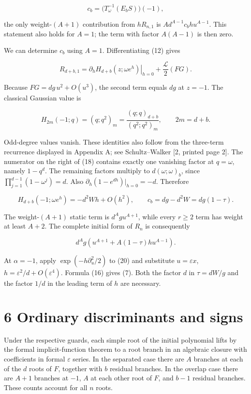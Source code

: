 \documentclass[
  11pt,
]{article}
\begin{document}
\[
c_b=\bigl(T_\omega^{-1}(E_bS)\bigr)(-1),
\]

the only weight-\((A+1)\) contribution from \(hR_{n,1}\) is
\(Ad^{A-1}c_bhu^{A-1}\). This statement also holds for \(A=1\); the term
with factor \(A(A-1)\) is then zero.

We can determine \(c_b\) using \(A=1\). Differentiating (12) gives

\[
R_{d+b,1}=\left.\partial_hH_{d+b}(z;\omega e^h)\right|_{h=0}
+\frac{\mathcal L}{2}(FG).
\]

Because \(FG=dg\,u^2+O(u^3)\), the second term equals \(dg\) at
\(z=-1\). The classical Gaussian value is

\[
H_{2m}(-1;q)=(q;q^2)_m
=\frac{(q;q)_{d+b}}{(q^2;q^2)_m},\qquad 2m=d+b. \tag{18}
\]

Odd-degree values vanish. These identities also follow from the
three-term recurrence displayed in Appendix A; see Schultz--Walker {[}2,
printed page 2{]}. The numerator on the right of (18) contains exactly
one vanishing factor at \(q=\omega\), namely \(1-q^d\). The remaining
factors multiply to \(d(\omega;\omega)_b\), since
\(\prod_{j=1}^{d-1}(1-\omega^j)=d\). Also
\(\partial_h(1-e^{dh})|_{h=0}=-d\). Therefore

\[
H_{d+b}(-1;\omega e^h)=-d^2Wh+O(h^2),
\qquad c_b=dg-d^2W=dg(1-\tau). \tag{19}
\]

The weight-\((A+1)\) static term is \(d^Agu^{A+1}\), while every
\(r\geq2\) term has weight at least \(A+2\). The complete initial form
of \(R_n\) is consequently

\[
d^Ag\left(u^{A+1}+A(1-\tau)hu^{A-1}\right). \tag{20}
\]

At \(\alpha=-1\), apply \(\exp(-h\partial_u^2/2)\) to (20) and
substitute \(u=\varepsilon x\), \(h=\varepsilon^2/d+O(\varepsilon^4)\).
Formula (16) gives (7). Both the factor \(d\) in \(\tau=dW/g\) and the
factor \(1/d\) in the leading term of \(h\) are necessary.

\section{6 Ordinary discriminants and
signs}\label{ordinary-discriminants-and-signs}

Under the respective guards, each simple root of the initial polynomial
lifts by the formal implicit-function theorem to a root branch in an
algebraic closure with coefficients in formal \(\varepsilon\) series. In
the separated case there are \(A\) branches at each of the \(d\) roots
of \(F\), together with \(b\) residual branches. In the overlap case
there are \(A+1\) branches at \(-1\), \(A\) at each other root of \(F\),
and \(b-1\) residual branches. These counts account for all \(n\) roots.
\end{document}
